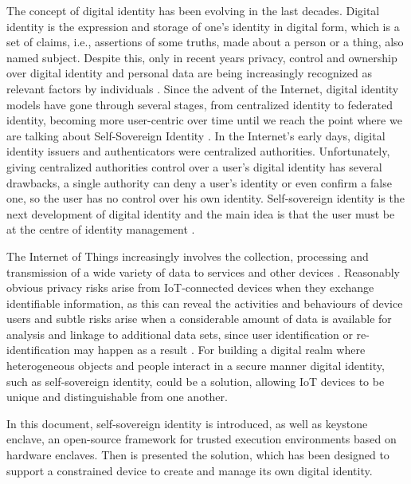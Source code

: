 
The concept of digital identity has been evolving in the last decades. Digital identity is the expression and storage of one's identity in digital form, which is a set of claims, i.e., assertions of some truths, made about a person or a thing, also named subject. Despite this, only in recent years privacy, control and ownership over digital identity and personal data are being increasingly recognized as relevant factors by individuals \cite{TheLawsOfIdentity}. 
Since the advent of the Internet, digital identity models have gone through several stages, from centralized identity to federated identity, becoming more user-centric over time until we reach the point where we are talking about Self-Sovereign Identity \cite{ThePathToSSI}.
In the Internet's early days, digital identity issuers and authenticators were centralized authorities. Unfortunately, giving centralized authorities control over a user's digital identity has several drawbacks, a single authority can deny a user's identity or even confirm a false one, so the user has no control over his own identity. Self-sovereign identity is the next development of digital identity and the main idea is that the user must be at the centre of identity management \cite{ThePathToSSI}.


The Internet of Things increasingly involves the collection, processing and transmission of a wide variety of data to services and other devices \cite{wilson2018digital}. Reasonably obvious privacy risks arise from IoT-connected devices when they exchange identifiable information, as this can reveal the activities and behaviours of device users and subtle risks arise when a considerable amount of data is available for analysis and linkage to additional data sets, since user identification or re-identification may happen as a result \cite{wilson2018digital}. For building a digital realm where heterogeneous objects and people interact in a secure manner digital identity, such as self-sovereign identity, could be a solution, allowing IoT devices to be unique and distinguishable from one another.


In this document, self-sovereign identity is introduced, as well as keystone enclave, an open-source framework for trusted execution environments based on hardware enclaves. Then is presented the solution, which has been designed to support a constrained device to create and manage its own digital identity. 


